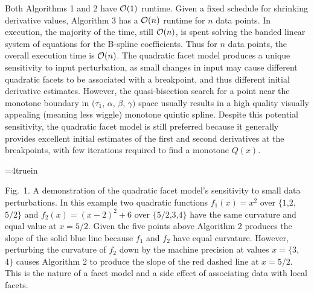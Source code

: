 
Both Algorithms 1 and 2 have ${\cal O}(1)$ runtime. Given a fixed schedule
for shrinking derivative values, Algorithm 3 has a ${\cal O}(n)$ runtime
for $n$ data points. In execution, the majority of the time, still ${\cal
O}(n)$, is spent solving the banded linear system of equations for the
B-spline coefficients.  Thus for $n$ data points, the overall execution
time is ${\cal O}(n)$.  The quadratic facet model produces a unique
sensitivity to input perturbation, as small changes in input may cause
different quadratic facets to be associated with a breakpoint, and thus
different initial derivative estimates.  However, the quasi-bisection
search for a point near the monotone boundary in $(\tau_1$, $\alpha$,
$\beta$, $\gamma)$ space usually results in a high quality visually appealing
(meaning less wiggle) monotone quintic spline.  Despite this potential
sensitivity, the quadratic facet model is still preferred because it
generally provides excellent initial estimates of the first and second
derivatives at the breakpoints, with few iterations required to find a
monotone $Q(x)$.

\topinsert
\centerline{\epsfxsize=4truein }
{\narrower\noindent\rmVIII Fig.\ 1.
A demonstration of the quadratic facet model's sensitivity to small
data perturbations. In this example two quadratic functions $f_1(x) =
x^2$ over $\{1$,$2$,$5/2\}$ and $f_2(x) = (x-2)^2 + 6$ over
$\{5/2$,$3$,$4\}$ have the same curvature and equal value at
$x=5/2$. Given the five points above Algorithm 2 produces the slope of
the solid blue line because $f_1$ and $f_2$ have equal curvature.
However, perturbing the curvature of $f_2$ down by the machine
precision at values $x=\{3$, $4\}$ causes Algorithm 2 to produce the
slope of the red dashed line at $x = 5/2$. This is the nature of a
facet model and a side effect of associating data with local facets.
\par}
\endinsert
